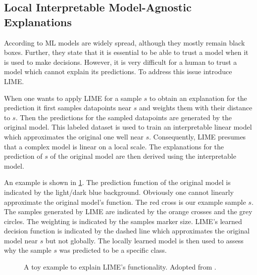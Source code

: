 \subsection{Local Interpretable Model-Agnostic Explanations}
\label{chp:fundamentals:sec:machine_learning:subsec:transfer_learning}
According to \textcite{Ribeiro:2016} \ac{ML} models are widely spread, although they mostly remain black boxes.
Further, they state that it is essential to be able to trust a model when it is used to make decisions.
However, it is very difficult for a human to trust a model which cannot explain its predictions.
To address this issue \textcite{Ribeiro:2016} introduce \ac{LIME}.

When one wants to apply \ac{LIME} for a sample $s$ to obtain an explanation for the prediction it first samples datapoints near $s$ and weights them with their distance to $s$.
Then the predictions for the sampled datapoints are generated by the original model.
This labeled dataset is used to train an interpretable linear model which approximates the original one well near $s$.
Consequently, \ac{LIME} presumes that a complex model is linear on a local scale.
The explanations for the prediction of $s$ of the original model are then derived using the interpretable model. \parencite{Ribeiro:2016}

An example is shown in \cref{fig:fundamentals:LIME}.
The prediction function of the original model is indicated by the light/dark blue background.
Obviously one cannot linearly approximate the original model's function.
The red cross is our example sample $s$.
The samples generated by \ac{LIME} are indicated by the orange crosses and the grey circles.
The weighting is indicated by the samples marker size.
\Ac{LIME}'s learned decision function is indicated by the dashed line which approximates the original model near $s$ but not globally.
The locally learned model is then used to assess why the sample $s$ was predicted to be a specific class.
\begin{figure}[htpb]
    \centering
    
    \caption[LIME Example Data]{A toy example to explain \ac{LIME}'s functionality. Adopted from \textcite{Ribeiro:2016}.}\label{fig:fundamentals:LIME}
\end{figure}
